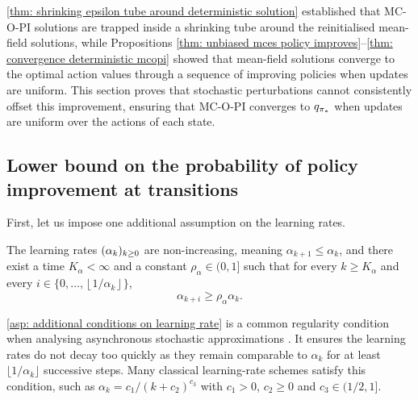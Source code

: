 

\autoref{thm: shrinking epsilon tube around deterministic solution} established that MC-O-PI solutions are trapped inside a shrinking tube around the reinitialised mean-field solutions,
while
Propositions \ref{thm: unbiased mces policy improves}--\ref{thm: convergence deterministic mcopi} showed that mean-field solutions converge to the optimal action values through a sequence of improving policies when updates are uniform.
This section proves that stochastic perturbations cannot consistently offset this improvement,
ensuring that MC-O-PI converges to $q_{{\pi}_*}$ when updates are uniform over the actions of each state.


\subsection{Lower bound on the probability of policy improvement at transitions}

First, let us impose one additional assumption on the learning rates.

\begin{assumption}
\label{asp: additional conditions on learning rate}
    The learning rates $(\alpha_k)_{k \ge 0}$ are non-increasing,
    meaning $\alpha_{k+1}\le \alpha_k$,
    and there exist a time $K_\alpha<\infty$ and a constant $\rho_\alpha\in(0,1]$ such that 
    for every $k\ge K_\alpha$
    and every $i \in \{0, \dots, \left\lfloor 1 / \alpha_k \right\rfloor\}$,
    \begin{equation}
    \label{eq:comparison}
    \alpha_{k+i}\ge \rho_\alpha \alpha_k .
    \end{equation}
\end{assumption}
\vspace{-0.6cm}

\autoref{asp: additional conditions on learning rate} is a common regularity condition when analysing asynchronous stochastic approximations
\citep{Borkar1998AsynchronousApproximations, Perkins2012AsynchronousInclusions, Liu2025TheNoise}.
It ensures the learning rates do not decay too quickly as they remain comparable to $\alpha_k$ for at least $\lfloor 1/\alpha_k \rfloor$ successive steps.
Many classical learning-rate schemes satisfy this condition, such as $\alpha_k = c_1 / (k+c_2)^{c_3}$ with $c_1>0$, $c_2 \ge 0$ and $c_3 \in (1/2, 1]$.

